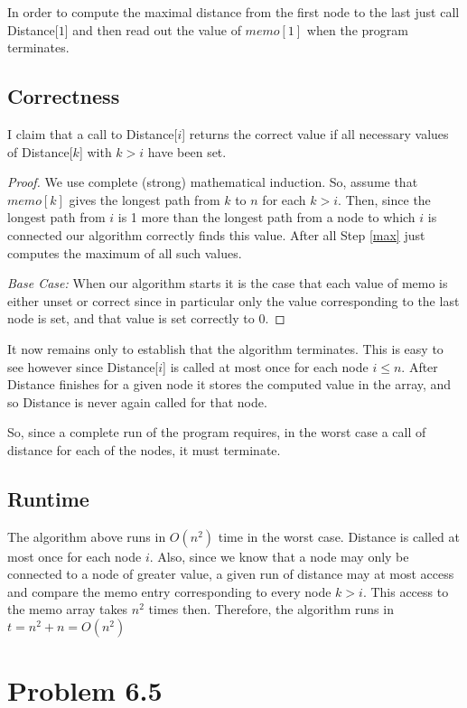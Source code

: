 \documentclass{article}
\begin{document}
In order to compute the maximal distance from the first node to the last just call Distance[$1$] and then read out the value of $memo[1]$ when the program terminates.

\subsection{Correctness}
I claim that a call to Distance[$i$] returns the correct value if all necessary values of Distance[$k$] with $k>i$ have been set.

\begin{proof}
We use complete (strong) mathematical induction. So, assume that $memo[k]$ gives the longest path from $k$ to $n$ for each $k > i$. Then, since the longest path from $i$ is 1 more than the longest path from a node to which $i$ is connected our algorithm correctly finds this value. After all Step \ref{max} just computes the maximum of all such values.

\emph{Base Case: }When our algorithm starts it is the case that each value of memo is either unset or correct since in particular only the value corresponding to the last node is set, and that value is set correctly to 0.
\end{proof}

It now remains only to establish that the algorithm terminates. This is easy to see however since Distance[$i$] is called at most once for each node $i \leq n$. After Distance finishes for a given node it stores the computed value in the array, and so Distance is never again called for that node.

So, since a complete run of the program requires, in the worst case a call of distance for each of the nodes, it must terminate.

\subsection{Runtime}

The algorithm above runs in $O(n^2)$ time in the worst case. Distance is called at most once for each node $i$. Also, since we know that a node may only be connected to a node of greater value, a given run of distance may at most access and compare the memo entry corresponding to every node $k>i$. This access to the memo array takes $n^2$ times then. Therefore, the algorithm runs in $t= n^2 +n= O(n^2)$

\section{Problem 6.5}
\end{document}
